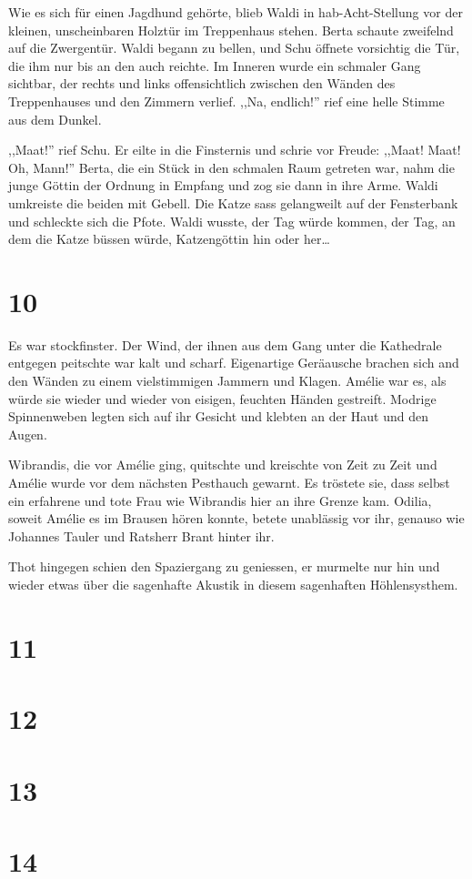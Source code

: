 Wie es sich für einen Jagdhund gehörte, blieb Waldi in hab-Acht-Stellung vor der kleinen, unscheinbaren Holztür im Treppenhaus stehen. Berta schaute zweifelnd auf die Zwergentür. Waldi begann zu bellen, und Schu öffnete vorsichtig die Tür, die ihm nur bis an den auch reichte. Im Inneren wurde ein schmaler Gang sichtbar, der rechts und links offensichtlich zwischen den Wänden des Treppenhauses und den Zimmern verlief. ,,Na, endlich!'' rief eine helle Stimme aus dem Dunkel.

,,Maat!'' rief Schu. Er eilte in die Finsternis und schrie vor Freude: ,,Maat! Maat! Oh, Mann!'' Berta, die ein Stück in den schmalen Raum getreten war, nahm die junge Göttin der Ordnung in Empfang und zog sie dann in ihre Arme. Waldi umkreiste die beiden mit Gebell. Die Katze sass gelangweilt auf der Fensterbank und schleckte sich die Pfote. Waldi wusste, der Tag würde kommen, der Tag, an dem die Katze büssen würde, Katzengöttin hin oder her\dots


\section*{10}

Es war stockfinster. Der Wind, der ihnen aus dem Gang unter die Kathedrale entgegen peitschte war kalt und scharf. Eigenartige Geräausche brachen sich and den Wänden zu einem vielstimmigen Jammern und Klagen. Amélie war es, als würde sie wieder und wieder von eisigen, feuchten Händen gestreift. Modrige Spinnenweben legten sich auf ihr Gesicht und klebten an der Haut und den Augen. 

Wibrandis, die vor Amélie ging, quitschte und kreischte von Zeit zu Zeit und Amélie wurde vor dem nächsten Pesthauch gewarnt. Es tröstete sie, dass selbst ein erfahrene und tote Frau wie Wibrandis hier an ihre Grenze kam. Odilia, soweit Amélie es im Brausen hören konnte, betete unablässig vor ihr, genauso wie Johannes Tauler und Ratsherr Brant hinter ihr.

Thot hingegen schien den Spaziergang zu geniessen, er murmelte nur hin und wieder etwas über die sagenhafte Akustik in diesem sagenhaften Höhlensysthem. 

\section*{11}

\section*{12}

\section*{13}

\section*{14}





